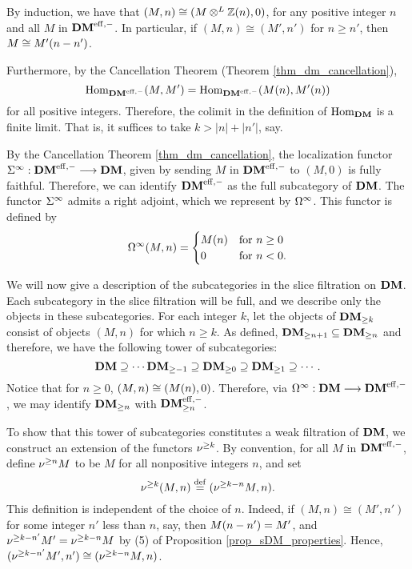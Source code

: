 By induction, we have that $(M, n) \cong (M \tDM \Z(n), 0)$, for 
any positive integer $n$ and all $M$ in $\DMeff$. In particular,
if $(M, n) \cong (M', n')$ for $n \geq n'$, then $M \cong 
\tZ[n - n']{M'}$.

Furthermore, by the Cancellation Theorem (Theorem 
\ref{thm_dm_cancellation}), 
\[
\homDMf(M, M') = \homDMf(\tZ[n]{M}, \tZ[n]{M'})
\]
for all positive integers. Therefore, the colimit in the 
definition of $\homDM$ is a finite limit. That is, it suffices to 
take $k > |n| + |n'|$, say.

By the Cancellation Theorem \ref{thm_dm_cancellation}, the
localization functor $\spectDM: \DMeff \to \DM$, given by sending $M$
in $\DMeff$ to $(M, 0)$ is fully faithful. Therefore, we can identify
$\DMeff$ as the full subcategory of $\DM$. The functor $\spectDM$
admits a right adjoint, which we represent by $\loopDM$. This functor
is defined by
\[
\loopDM(M, n) = \begin{cases}
\LHI[n]{M} &\textrm{for }n \geq 0 \\
0 &\textrm{for }n < 0.
\end{cases}
\]

We will now give a description of the subcategories in the slice
filtration on $\DM$. Each subcategory in the slice filtration 
will be full, and we describe only the objects in these 
subcategories. For each integer $k$, let the objects of 
$\GFiltDM[k]{\DM}$ consist of objects $(M, n)$ for which $n \geq 
k$. As defined, $\GFiltDM[n + 1]{\DM} \subseteq \GFiltDM[n]{\DM}$ 
and therefore, we have the following tower of subcategories:
\begin{equation}\label{eq_DM_slice_filt}
\DM \supseteq \cdots \GFiltDM[-1]{\DM} \supseteq \GFiltDM[0]{\DM}
   \supseteq \GFiltDM[1]{\DM} \supseteq \cdots.
\end{equation}
Notice that for $n \geq 0$, $(M, n) \cong (\tZ[n]{M}, 0)$. 
Therefore, via $\loopDM: \DM \to \DMeff$, we may identify 
$\GFiltDM[n]{\DM}$ with $\GFiltDM[n]{\DMeff}$.

To show that this tower of subcategories constitutes a weak 
filtration of $\DM$, we construct an extension of the functors 
$\sgDM{k}$.  By convention, for all $M$ in $\DMeff$, define 
$\sgDM{n} M$ to be $M$ for all nonpositive integers $n$, and set
\[
\sgDM{k}(M, n) \defeq (\sgDM{k - n}M, n).
\]
This definition is independent of the choice of $n$. Indeed, if
$(M, n) \cong (M', n')$ for some integer $n'$ less than $n$, say, 
then $\tZ[n - n']{M} = M'$, and $\sgDM{k - n'}M' = \sgDM{k - n}M$ 
by (5) of Proposition \ref{prop_sDM_properties}. Hence, 
$(\sgDM{k - n'}M', n') \cong (\sgDM{k - n}M, n)$.

